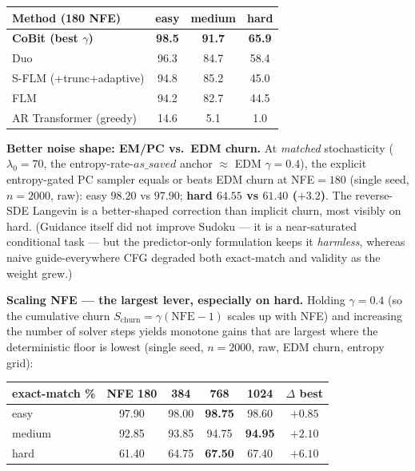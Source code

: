 \documentclass[10pt]{article}
\newcommand{\best}[1]{\textbf{\color{cobit}#1}}
\begin{document}
\begin{center}\small
\begin{tabular}{l c c c}
\toprule
\textbf{Method (180 NFE)} & \textbf{easy} & \textbf{medium} & \textbf{hard} \\
\midrule
\best{CoBit (best $\gamma$)}      & \best{98.5} & \best{91.7} & \best{65.9} \\
Duo                                & 96.3 & 84.7 & 58.4 \\
S-FLM (+trunc+adaptive)            & 94.8 & 85.2 & 45.0 \\
FLM                                & 94.2 & 82.7 & 44.5 \\
AR Transformer (greedy)            & 14.6 & \phantom{0}5.1 & \phantom{0}1.0 \\
\bottomrule
\end{tabular}
\end{center}

\textbf{Better noise shape: EM/PC vs.\ EDM churn.} At \emph{matched} stochasticity
($\lambda_0{=}70$, the entropy-rate-$as\_saved$ anchor $\approx$ EDM $\gamma{=}0.4$), the explicit
entropy-gated PC sampler equals or beats EDM churn at NFE${=}180$ (single seed, $n{=}2000$, raw):
easy $98.20$ vs $97.90$; \best{hard $64.55$ vs $61.40$ ($+3.2$)}. The reverse-SDE Langevin is a
better-shaped correction than implicit churn, most visibly on hard. (Guidance itself did not
improve Sudoku --- it is a near-saturated conditional task --- but the predictor-only formulation
keeps it \emph{harmless}, whereas naive guide-everywhere CFG degraded both exact-match and
validity as the weight grew.)

\textbf{Scaling NFE --- the largest lever, especially on hard.} Holding $\gamma{=}0.4$ (so the
cumulative churn $S_\mathrm{churn}=\gamma(\mathrm{NFE}{-}1)$ scales up with NFE) and increasing the
number of solver steps yields monotone gains that are largest where the deterministic floor is
lowest (single seed, $n{=}2000$, raw, EDM churn, entropy grid):

\begin{center}\small
\begin{tabular}{l c c c c c}
\toprule
\textbf{exact-match \%} & \textbf{NFE 180} & \textbf{384} & \textbf{768} & \textbf{1024} & \textbf{$\Delta$ best} \\
\midrule
easy   & 97.90 & 98.00 & \best{98.75} & 98.60 & $+0.85$ \\
medium & 92.85 & 93.85 & 94.75 & \best{94.95} & $+2.10$ \\
hard   & 61.40 & 64.75 & \best{67.50} & 67.40 & \best{$+6.10$} \\
\bottomrule
\end{tabular}
\end{center}
\end{document}

